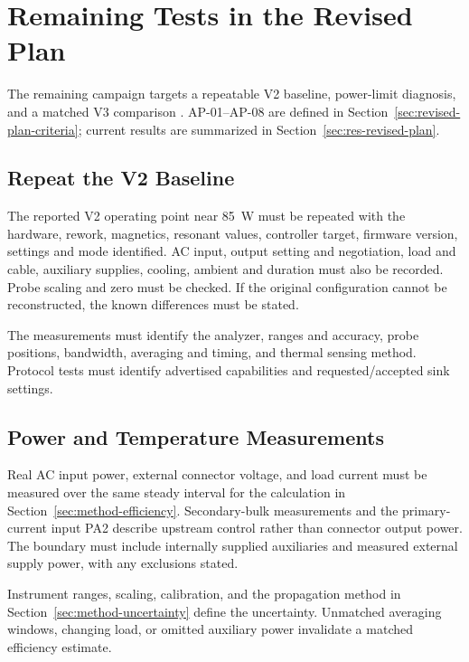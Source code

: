 \section{Remaining Tests in the Revised Plan}
\label{sec:method-plan-validation}

The remaining campaign targets a repeatable V2 baseline, power-limit diagnosis,
and a matched V3 comparison \cite{projectOctoberPlan}. AP-01--AP-08 are defined
in Section~\ref{sec:revised-plan-criteria}; current results are summarized in
Section~\ref{sec:res-revised-plan}.

\subsection{Repeat the V2 Baseline}

The reported V2 operating point near \SI{85}{\watt} must be repeated with
the hardware, rework, magnetics, resonant values, controller target, firmware version, settings and mode
identified. AC input, output setting and negotiation, load and cable, auxiliary
supplies, cooling, ambient and duration must also be recorded. Probe scaling
and zero must be checked. If the original configuration cannot be reconstructed,
the known differences must be stated.

The measurements must identify the analyzer, ranges and accuracy,
probe positions, bandwidth, averaging and timing, and thermal sensing method.
Protocol tests must identify advertised capabilities and requested/accepted
sink settings.

\subsection{Power and Temperature Measurements}

Real AC input power, external connector voltage, and load current must be
measured over the same steady interval for the calculation in
Section~\ref{sec:method-efficiency}. Secondary-bulk measurements and the
primary-current input PA2 describe upstream control rather than connector
output power. The boundary must include internally supplied auxiliaries and
measured external supply power, with any exclusions stated.

Instrument ranges, scaling, calibration, and the propagation method in
Section~\ref{sec:method-uncertainty} define the uncertainty. Unmatched
averaging windows, changing load, or omitted auxiliary power invalidate a
matched efficiency estimate.


